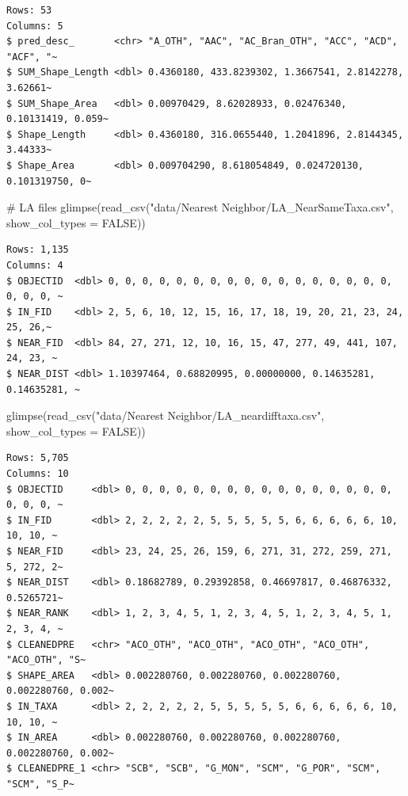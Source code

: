 \documentclass[
  letterpaper,
  DIV=11,
  numbers=noendperiod]{scrartcl}
\newenvironment{Shaded}{\begin{snugshade}}{\end{snugshade}}
\newcommand{\AttributeTok}[1]{\textcolor[rgb]{0.40,0.45,0.13}{#1}}
\newcommand{\CommentTok}[1]{\textcolor[rgb]{0.37,0.37,0.37}{#1}}
\newcommand{\ConstantTok}[1]{\textcolor[rgb]{0.56,0.35,0.01}{#1}}
\newcommand{\FunctionTok}[1]{\textcolor[rgb]{0.28,0.35,0.67}{#1}}
\newcommand{\NormalTok}[1]{\textcolor[rgb]{0.00,0.23,0.31}{#1}}
\newcommand{\StringTok}[1]{\textcolor[rgb]{0.13,0.47,0.30}{#1}}
\begin{document}
\begin{verbatim}
Rows: 53
Columns: 5
$ pred_desc_       <chr> "A_OTH", "AAC", "AC_Bran_OTH", "ACC", "ACD", "ACF", "~
$ SUM_Shape_Length <dbl> 0.4360180, 433.8239302, 1.3667541, 2.8142278, 3.62661~
$ SUM_Shape_Area   <dbl> 0.00970429, 8.62028933, 0.02476340, 0.10131419, 0.059~
$ Shape_Length     <dbl> 0.4360180, 316.0655440, 1.2041896, 2.8144345, 3.44333~
$ Shape_Area       <dbl> 0.009704290, 8.618054849, 0.024720130, 0.101319750, 0~
\end{verbatim}

\begin{Shaded}
\begin{Highlighting}[]
\CommentTok{\# LA files}
\FunctionTok{glimpse}\NormalTok{(}\FunctionTok{read\_csv}\NormalTok{(}\StringTok{"data/Nearest Neighbor/LA\_NearSameTaxa.csv"}\NormalTok{, }\AttributeTok{show\_col\_types =} \ConstantTok{FALSE}\NormalTok{))}
\end{Highlighting}
\end{Shaded}

\begin{verbatim}
Rows: 1,135
Columns: 4
$ OBJECTID  <dbl> 0, 0, 0, 0, 0, 0, 0, 0, 0, 0, 0, 0, 0, 0, 0, 0, 0, 0, 0, 0, ~
$ IN_FID    <dbl> 2, 5, 6, 10, 12, 15, 16, 17, 18, 19, 20, 21, 23, 24, 25, 26,~
$ NEAR_FID  <dbl> 84, 27, 271, 12, 10, 16, 15, 47, 277, 49, 441, 107, 24, 23, ~
$ NEAR_DIST <dbl> 1.10397464, 0.68820995, 0.00000000, 0.14635281, 0.14635281, ~
\end{verbatim}

\begin{Shaded}
\begin{Highlighting}[]
\FunctionTok{glimpse}\NormalTok{(}\FunctionTok{read\_csv}\NormalTok{(}\StringTok{"data/Nearest Neighbor/LA\_neardifftaxa.csv"}\NormalTok{, }\AttributeTok{show\_col\_types =} \ConstantTok{FALSE}\NormalTok{))}
\end{Highlighting}
\end{Shaded}

\begin{verbatim}
Rows: 5,705
Columns: 10
$ OBJECTID     <dbl> 0, 0, 0, 0, 0, 0, 0, 0, 0, 0, 0, 0, 0, 0, 0, 0, 0, 0, 0, ~
$ IN_FID       <dbl> 2, 2, 2, 2, 2, 5, 5, 5, 5, 5, 6, 6, 6, 6, 6, 10, 10, 10, ~
$ NEAR_FID     <dbl> 23, 24, 25, 26, 159, 6, 271, 31, 272, 259, 271, 5, 272, 2~
$ NEAR_DIST    <dbl> 0.18682789, 0.29392858, 0.46697817, 0.46876332, 0.5265721~
$ NEAR_RANK    <dbl> 1, 2, 3, 4, 5, 1, 2, 3, 4, 5, 1, 2, 3, 4, 5, 1, 2, 3, 4, ~
$ CLEANEDPRE   <chr> "ACO_OTH", "ACO_OTH", "ACO_OTH", "ACO_OTH", "ACO_OTH", "S~
$ SHAPE_AREA   <dbl> 0.002280760, 0.002280760, 0.002280760, 0.002280760, 0.002~
$ IN_TAXA      <dbl> 2, 2, 2, 2, 2, 5, 5, 5, 5, 5, 6, 6, 6, 6, 6, 10, 10, 10, ~
$ IN_AREA      <dbl> 0.002280760, 0.002280760, 0.002280760, 0.002280760, 0.002~
$ CLEANEDPRE_1 <chr> "SCB", "SCB", "G_MON", "SCM", "G_POR", "SCM", "SCM", "S_P~
\end{verbatim}
\end{document}
